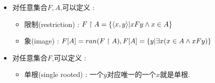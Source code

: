 {{{\begin{itemize}
{\begin{itemize}
{                  证明 : \begin{math}
                    \forall\dependent{x,y}, \dependent{x,y} \in (R_1 \circ R_2) \circ R_3 \\
                    \Leftrightarrow \exists z (x R_3 z \land z(R_1 \circ R_2)y) \\
                    \Leftrightarrow \exists z (x R_3 z \land \exists t(z R_2 t \land t R_1 y)) \\
                    \Leftrightarrow \exists z \exists t(x R_3 z \land (z R_2 t \land t R_1 y)) \\
                    \Leftrightarrow \exists t \exists z(x R_3 z \land z R_2 t \land t R_1 y) \\
                    \Leftrightarrow \exists t \exists z (x R_3 z \land z R_2 t \land t R_1 y) \\
                    \Leftrightarrow \exists t(\exists z(x R_3 z \land z R_2 t) \land t R_1 y) \\
                    \Leftrightarrow \exists t(x(R_2 \circ R_3)t \land t R_1 y) \\
                    \Leftrightarrow x R_1 \circ (R_2 \circ R_3) y \\
                    \Leftrightarrow \dependent{x,y} \in R_1 \circ (R_2 \circ R_3) \\
                    \therefore (R_1 \circ R_2) \circ R_3 = R_1 \circ (R_2 \circ R_3)
                  \end{math}

                  \qed
                  }
          \end{itemize}
          }
    \item {
          对任意集合$F,A$,可以定义 :

          \begin{itemize}
            \item 限制(restriction) : $F \upharpoonright  A = \left\{ \langle x,y\rangle | xFy \land x \in A \right\}$
            \item 象(image) : $F[A] = ran(F \upharpoonright A),F[A] = \left\{ y | \exists x (x \in A \land xFy) \right\}$
          \end{itemize}
          }
    \item {
          对任意集合$F$,可以定义 :

          \begin{itemize}
            \item {
                  单根(single rooted) : 一个$y$对应唯一的一个$x$就是单根.

}
\end{itemize}}
\end{itemize}}}}
